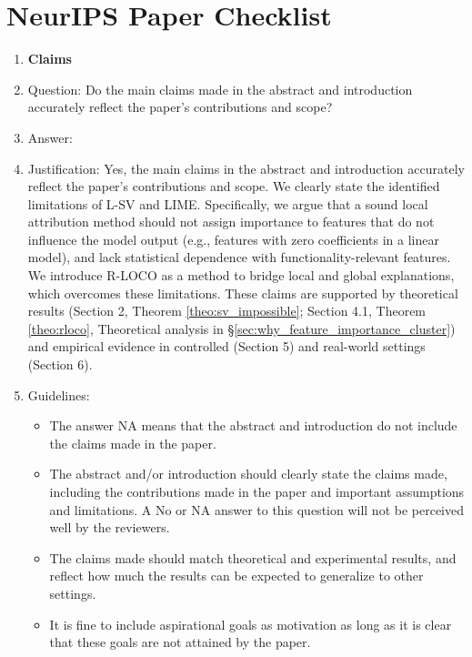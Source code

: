 \documentclass{article}
\theoremstyle{plain}
\theoremstyle{definition}
\theoremstyle{remark}
\begin{document}

\newpage
\section*{NeurIPS Paper Checklist}




\begin{enumerate}

\item {\bf Claims}
    \item[] Question: Do the main claims made in the abstract and introduction accurately reflect the paper's contributions and scope?
    \item[] Answer:  \answerYes{}
    \item[] Justification:  Yes, the main claims in the abstract and introduction accurately reflect the paper’s contributions and scope. We clearly state the identified limitations of L-SV and LIME.  Specifically, we argue that a sound local attribution method should not assign importance to features that do not influence the model output (e.g., features with zero coefficients in a linear model), and lack statistical dependence with functionality-relevant features. We introduce R-LOCO as a method to bridge local and global explanations, which overcomes these limitations. These claims are supported by theoretical results (Section 2, Theorem \ref{theo:sv_impossible}; Section 4.1, Theorem \ref{theo:rloco}, Theoretical analysis in \S\ref{sec:why_feature_importance_cluster}) and empirical evidence in controlled (Section 5) and real-world settings (Section 6).
    \item[] Guidelines:
    \begin{itemize}
        \item The answer NA means that the abstract and introduction do not include the claims made in the paper.
        \item The abstract and/or introduction should clearly state the claims made, including the contributions made in the paper and important assumptions and limitations. A No or NA answer to this question will not be perceived well by the reviewers. 
        \item The claims made should match theoretical and experimental results, and reflect how much the results can be expected to generalize to other settings. 
        \item It is fine to include aspirational goals as motivation as long as it is clear that these goals are not attained by the paper. 
    \end{itemize}


\end{enumerate}
\end{document}
